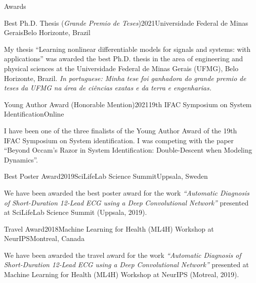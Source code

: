 \documentclass{resume} %
\begin{document}
\begin{rSection}{Awards}

\begin{rSubsection}{Best Ph.D. Thesis (\textit{Grande Premio de Teses})}{2021}{Universidade Federal de Minas Gerais}{Belo Horizonte, Brazil}

\item My thesis ``Learning nonlinear differentiable models for signals and systems: with applications'' was awarded the best Ph.D. thesis in the area of engineering and physical sciences  at the Universidade Federal de Minas Gerais (UFMG), Belo Horizonte, Brazil. \textit{In portuguese: Minha tese foi ganhadora do grande premio de teses da UFMG na \'area de ci\^encias exatas e da terra e  engenharias.}
\end{rSubsection}

\begin{rSubsection}{Young Author Award (Honorable Mention)}{2021}{19th IFAC Symposium on System Identification}{Online}

\item I have been one of the three finalists of the Young Author Award of the 19th IFAC Symposium on System identification. I was competing with the paper ``Beyond Occam’s Razor in System Identification: Double-Descent when Modeling Dynamics''.
\end{rSubsection}

\begin{rSubsection}{Best Poster Award}{2019}{SciLifeLab Science Summit}{Uppsala, Sweden}

\item We have been awarded the best poster award for the work \textit{``Automatic Diagnosis of Short-Duration 12-Lead ECG using a Deep Convolutional Network''} presented at SciLifeLab Science Summit (Uppsala, 2019).
\end{rSubsection}


\begin{rSubsection}{Travel Award}{2018}{Machine Learning for Health (ML4H) Workshop at NeurIPS}{Montreal, Canada}
\item  We have been awarded the travel award for the work \textit{``Automatic Diagnosis of Short-Duration 12-Lead ECG using a Deep Convolutional Network''} presented at Machine Learning for Health (ML4H) Workshop at NeurIPS (Motreal, 2019).
\end{rSubsection}


\end{rSection}
\end{document}
